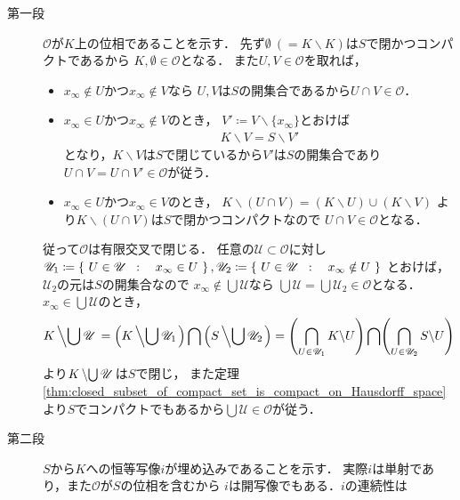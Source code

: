 	\begin{prf}\mbox{}
		\begin{description}
			\item[第一段]
				$\mathscr{O}$が$K$上の位相であることを示す．
				先ず$\emptyset\ (= K \backslash K)$は$S$で閉かつコンパクトであるから
				$K,\emptyset \in \mathscr{O}$となる．
				また$U,V \in \mathscr{O}$を取れば，
				\begin{itemize}
					\item $x_\infty \notin U$かつ$x_\infty \notin V$なら
						$U,V$は$S$の開集合であるから$U \cap V \in \mathscr{O}$．
					
					\item $x_\infty \in U$かつ$x_\infty \notin V$のとき，
						$V' \coloneqq V \backslash \{x_\infty\}$とおけば
						\begin{align}
							K \backslash V = S \backslash V'
						\end{align}
						となり，$K \backslash V$は$S$で閉じているから$V'$は$S$の開集合であり
						$U \cap V = U \cap V' \in \mathscr{O}$が従う．
						
					\item $x_\infty \in U$かつ$x_\infty \in V$のとき，
						$K \backslash (U \cap V)= (K \backslash U) \cup (K \backslash V)$
						より$K \backslash (U \cap V)$は$S$で閉かつコンパクトなので
						$U \cap V \in \mathscr{O}$となる．
				\end{itemize}
				従って$\mathscr{O}$は有限交叉で閉じる．
				任意の$\mathscr{U} \subset \mathscr{O}$に対し
				$\mathscr{U}_1 \coloneqq \left\{\ U \in \mathscr{U}\ \, : \quad x_\infty \in U\ \right\},
				\mathscr{U}_2 \coloneqq \left\{\ U \in \mathscr{U}\ \, : \quad x_\infty \notin U\ \right\}$
				とおけば，$\mathscr{U}_2$の元は$S$の開集合なので
				$x_\infty \notin \bigcup \mathscr{U}$なら
				$\bigcup \mathscr{U} = \bigcup \mathscr{U}_2 \in \mathscr{O}$となる．
				$x_\infty \in \bigcup \mathscr{U}$のとき，
				\begin{align}
					K \left\backslash \bigcup \mathscr{U} \right.
					= \left(K \left\backslash \bigcup \mathscr{U}_1 \right.\right)
					\bigcap \left(S \left\backslash \bigcup \mathscr{U}_2 \right.\right)
					= \Biggl( \bigcap_{U \in \mathscr{U}_1} K \backslash U \Biggr)
					\bigcap \Biggl( \bigcap_{U \in \mathscr{U}_2} S \backslash U \Biggr)
				\end{align}
				より$K\left\backslash \bigcup \mathscr{U}\right.$は$S$で閉じ，
				また定理\ref{thm:closed_subset_of_compact_set_is_compact_on_Hausdorff_space}
				より$S$でコンパクトでもあるから$\bigcup \mathscr{U} \in \mathscr{O}$が従う．
				
			\item[第二段] $S$から$K$への恒等写像$i$が埋め込みであることを示す．
				実際$i$は単射であり，また$\mathscr{O}$が$S$の位相を含むから
				$i$は開写像でもある．$i$の連続性は
		\end{description}
	\end{prf}